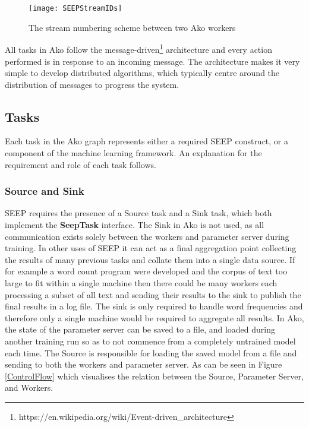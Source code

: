 \documentclass[12pt]{article}
\begin{document}
\begin{figure}[H]
  \centering
  \texttt{[image: SEEPStreamIDs]}
  \caption[]{The stream numbering scheme between two Ako workers}
  \label{SEEPStreamIDs}
\end{figure}

All tasks in Ako follow the message-driven\footnote{https://en.wikipedia.org/wiki/Event-driven\_architecture} architecture and every action performed is in response to an incoming message. The architecture makes it very simple to develop distributed algorithms, which typically centre around the distribution of messages to progress the system.

\subsection{Tasks}

Each task in the Ako graph represents either a required SEEP construct, or a component of the machine learning framework. An explanation for the requirement and role of each task follows. 

\subsubsection{Source and Sink}

SEEP requires the presence of a Source task and a Sink task, which both implement the \textbf{SeepTask} interface. The Sink in Ako is not used, as all communication exists solely between the workers and parameter server during training. In other uses of SEEP it can act as a final aggregation point collecting the results of many previous tasks and collate them into a single data source. If for example a word count program were developed and the corpus of text too large to fit within a single machine then there could be many workers each processing a subset of all text and sending their results to the sink to publish the final results in a log file. The sink is only required to handle word frequencies and therefore only a single machine would be required to aggregate all results.
\newline
\newline
In Ako, the state of the parameter server can be saved to a file, and loaded during another training run so as to not commence from a completely untrained model each time. The Source is responsible for loading the saved model from a file and sending to both the workers and parameter server. As can be seen in Figure \ref{ControlFlow} which visualises the relation between the Source, Parameter Server, and Workers.
\end{document}
